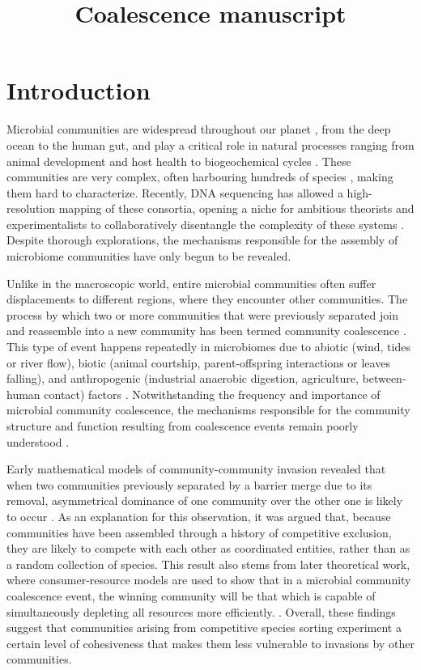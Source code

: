 \documentclass[12pt]{article}
\title{Coalescence manuscript}
\begin{document}
	\maketitle
	\section{Introduction}
	
    	Microbial communities are widespread throughout our planet \citep{Fierer2006}, from the deep ocean to the human gut, and play a critical role in natural processes ranging from animal development and host health \citep{Huttenhower2012, McFall-Ngai2013} to biogeochemical cycles \citep{Falkowski2008}. These communities are very complex, often harbouring hundreds of species \citep{Gilbert2014}, making them hard to characterize. Recently, DNA sequencing has allowed a high-resolution mapping of these consortia, opening a niche for ambitious theorists and experimentalists to collaboratively disentangle the complexity of these systems \citep{Marsland2019, Goldford2018, Goyal2018, Friedman2017, Costello2012, Vila2019, Estrela2020, Coyte2021}. Despite thorough explorations, the mechanisms responsible for the assembly of microbiome communities have only begun to be revealed. \par
    	Unlike in the macroscopic world, entire microbial communities often suffer displacements to different regions, where they encounter other communities. The process by which two or more communities that were previously separated join and reassemble into a new community has been termed community coalescence \citep{Rillig2015}. This type of event  happens repeatedly in microbiomes due to abiotic (wind, tides or river flow), biotic (animal courtship, parent-offspring interactions or leaves falling), and anthropogenic (industrial anaerobic digestion, agriculture, between-human contact) factors \citep{Luo2020, Vass2021, Castledine2020}. Notwithstanding the frequency and importance of microbial community coalescence, the mechanisms responsible for the community structure and function resulting from coalescence events remain poorly understood \citep{Rillig2016b}.\par
    	Early mathematical models of community-community invasion revealed that when two communities previously separated by a barrier merge due to its removal, asymmetrical dominance of one community over the other one is likely to occur \citep{Gilpin1994, Toquenaga1997}. As an explanation for this observation, it was argued that, because communities have been assembled through a history of competitive exclusion, they are likely to compete with each other as coordinated entities, rather than as a random collection of species. This result also stems from later theoretical work, where consumer-resource models are used to show that in a microbial community coalescence event, the winning community will be that which is capable of simultaneously depleting all resources more efficiently. \citep{Tikhonov2016, Tikhonov2017}.  Overall, these findings suggest that communities arising from competitive species sorting experiment a certain level of cohesiveness that makes them less vulnerable to invasions by other communities.\par 
\end{document}
